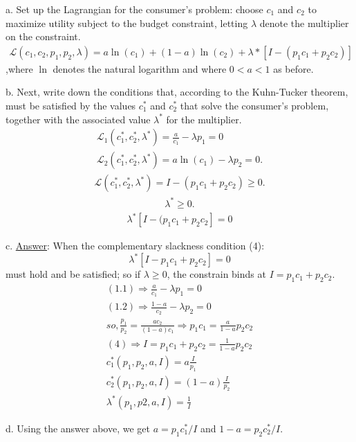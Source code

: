 \documentclass[12pt]{article}
\begin{document}
\begin{description}
\item a. Set up the Lagrangian for the consumer's problem: choose $c_{1}$ and $c_{2}$ to maximize utility subject to the budget constraint, letting $\lambda$ denote the multiplier on the constraint.
\begin{gather*}
  \mathcal{L}(c_1,c_2,p_1,p_2,\lambda) = a\ln(c_{1}) + (1-a)\ln(c_{2}) + \lambda*[I - (p_{1}c_{1}+p_{2}c_{2})]
\end{gather*}
,where $\ln$ denotes the natural logarithm and where $0<a<1$ as before.
\item b. Next, write down the conditions that, according to the Kuhn-Tucker theorem, must be satisfied by the values $c_{1}^{*}$ and $c_{2}^{*}$ that solve the consumer's problem, together with the associated value $\lambda^{*}$ for the multiplier.
\begin{align*}
    \mathcal{L}_{1}(c_1^*,c_2^*, \lambda^*) = \frac{a}{c_1} - \lambda p_1 = 0    \tag{1.1}\\
    \mathcal{L}_{2}(c_1^*, c_2^*, \lambda^*) = a\ln(c_1) - \lambda p_2 = 0 .  \tag{1.2}
\end{align*}
\begin{align*}
    \mathcal{L}(c_1^*, c_2^*, \lambda^*) = I - (p_1c_1+p_2c_2) \geq 0 .  \tag{2}
\end{align*}
\begin{align*}
    \lambda^* \geq 0 . \tag{3}
\end{align*}
\begin{align*}
    \lambda^*[I - (p_1c_1+p_2c_2] = 0  \tag{4}
\end{align*}
\item c. \underline{Answer}: When the complementary slackness condition (4): 
\[\lambda^*[I - p_1c_1+p_2c_2] = 0 \] must hold and be satisfied; so if $\lambda \geq 0$, the constrain binds at $I = p_1c_1+p_2c_2$. 
\begin{gather*}
    (1.1) \Rightarrow \frac{a}{c_1} - \lambda p_1 = 0 \\
    (1.2) \Rightarrow \frac{1-a}{c_2} - \lambda p_2 = 0 \\
    so, \frac{p_1}{p_2} = \frac{ac_2}{(1-a)c_1} \Rightarrow p_1c_1 = \frac{a}{1-a}p_2c_2 \\
    (4) \Rightarrow I = p_1c_1+p_2c_2 = \frac{1}{1-a}p_2c_2 \\
    c_1^*(p_1,p_2,a,I) = a\frac{I}{p_1} \\ 
    c_2^*(p_1,p_2,a,I) = (1-a)\frac{I}{p_2} \\
    \lambda^*(p_1,p2,a,I) = \frac{1}{I}
\end{gather*}
\item d. Using the answer above, we get $a = p_1c_1^*/I$ and $1-a = p_2c_2^*/I$. 

\end{description}
\end{document}
